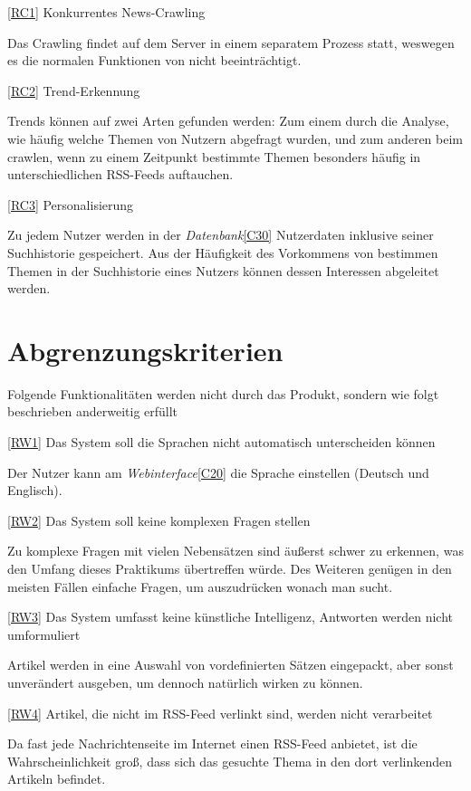 \ref{RC1} Konkurrentes News-Crawling

Das Crawling findet auf dem Server in einem separatem Prozess statt, weswegen es die normalen Funktionen von \NewsGenie nicht beeinträchtigt.

\ref{RC2} Trend-Erkennung

Trends können auf zwei Arten gefunden werden:
Zum einem durch die Analyse, wie häufig welche Themen von Nutzern abgefragt wurden, 
und zum anderen beim crawlen, wenn zu einem Zeitpunkt bestimmte Themen besonders häufig in unterschiedlichen RSS-Feeds auftauchen.

\ref{RC3} Personalisierung

Zu jedem Nutzer werden in der \textit{Datenbank}\ref{C30} Nutzerdaten inklusive seiner Suchhistorie gespeichert.
Aus der Häufigkeit des Vorkommens von bestimmen Themen in der Suchhistorie eines Nutzers können dessen Interessen abgeleitet werden.

\section{Abgrenzungskriterien}

Folgende Funktionalitäten werden nicht durch das Produkt, sondern wie folgt
beschrieben anderweitig erfüllt

\ref{RW1} Das System soll die Sprachen nicht automatisch unterscheiden können

Der Nutzer kann am \textit{Webinterface}\ref{C20} die Sprache einstellen (Deutsch und Englisch).

\ref{RW2} Das System soll keine komplexen Fragen stellen

Zu komplexe Fragen mit vielen Nebensätzen sind äußerst schwer zu erkennen, was den Umfang dieses Praktikums 
übertreffen würde.
Des Weiteren genügen in den meisten Fällen einfache Fragen, um auszudrücken wonach man sucht.

\ref{RW3} Das System umfasst keine künstliche Intelligenz, Antworten werden
nicht umformuliert

Artikel werden in eine Auswahl von vordefinierten Sätzen eingepackt, aber sonst unverändert ausgeben, um dennoch natürlich wirken zu können.

\ref{RW4} Artikel, die nicht im RSS-Feed verlinkt sind, werden nicht
verarbeitet

Da fast jede Nachrichtenseite im Internet einen RSS-Feed anbietet, ist die Wahrscheinlichkeit groß, dass sich das gesuchte Thema in den dort verlinkenden Artikeln befindet.